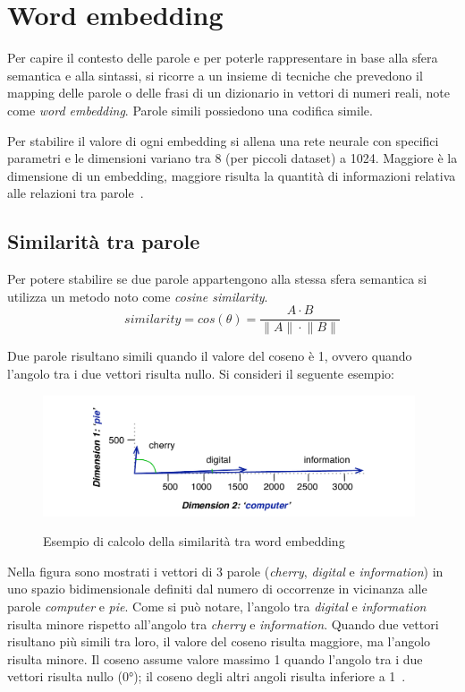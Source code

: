 \section{Word embedding}
\label{sec:word embedding}
Per capire il contesto delle parole e per poterle rappresentare in base alla sfera semantica e alla sintassi, si ricorre a un insieme di tecniche che prevedono il mapping delle parole o delle frasi di un dizionario in vettori di numeri reali, note come \emph{word embedding}.
Parole simili possiedono una codifica simile.


Per stabilire il valore di ogni embedding si allena una rete neurale con specifici parametri e le dimensioni variano tra 8 (per piccoli dataset) a 1024. Maggiore è la dimensione di un embedding, maggiore risulta la quantità di informazioni relativa alle relazioni tra parole~\cite{tensword}.

\subsection{Similarità tra parole}
\label{Similarita tra parole}
Per potere stabilire se due parole appartengono alla stessa sfera semantica si utilizza un metodo noto come \emph{cosine similarity}.
\begin{equation}
    similarity = cos(\theta) = \frac{A\cdot{B}}{\|A\|\cdot{\|B\|}}
\end{equation}

Due parole risultano simili quando il valore del coseno è 1, ovvero quando l'angolo tra i due vettori risulta nullo. Si consideri il seguente esempio:

\begin{figure}[h]
    \centering
    \includegraphics[width=11cm]{./immagini/cosine_similarity_esempio.png}
    \label{cosine}
    \caption{Esempio di calcolo della similarità tra word embedding~\cite{cosine}}
\end{figure}

Nella figura sono mostrati i vettori di 3 parole (\textit{cherry}, \textit{digital} e \textit{information}) in uno spazio bidimensionale definiti dal numero di occorrenze in vicinanza alle parole \textit{computer} e \textit{pie}.
Come si può notare, l'angolo tra \textit{digital} e \textit{information} risulta minore rispetto all'angolo tra \textit{cherry} e \textit{information}.
Quando due vettori risultano più simili tra loro, il valore del coseno risulta maggiore, ma l'angolo risulta minore. Il coseno assume valore massimo 1 quando l'angolo tra i due vettori risulta nullo (0°); il coseno degli altri angoli risulta inferiore a 1~\cite{cosine}.
